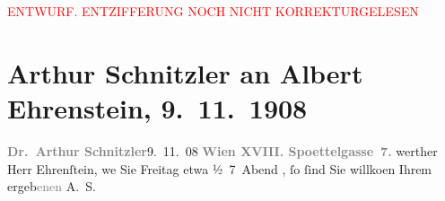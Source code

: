 
\begin{center}
            \textcolor{red}{ENTWURF. ENTZIFFERUNG NOCH NICHT KORREKTURGELESEN}
                      \end{center}
            
               \section[Arthur Schnitzler an Albert Ehrenstein, 9. 11. 1908]{ Arthur Schnitzler an Albert Ehrenstein, 9. 11. 1908}\nopagebreak{}\rehead{ }\begin{ledgroupsized}[t]{13cm}\normalsize\beginnumbering{} \toendnotes[C]{\smallbreak\pagebreak[2]} 
\toendnotes[C]{\smallbreak}\pstart
           \noindent{}{\pb}\textcolor{gray}{\textbf{Dr. Arthur Schnitzler}}\hfill 9. 11. 08\pend
           \pstart
           \textcolor{gray}{\textbf{Wien XVIII. Spoettelgasse 7.}}\pend
           \pstart{}werther Herr Ehrenſtein,\pend\pstart
           we{\geminationn}{ }Sie Freitag etwa
                        ½ 7 Abend{ }\label{K_L01798_1v}\label{K_L01798_1h}, ſo ſind Sie willko{\geminationm}en Ihrem\pend
           \pstart ergeb\textcolor{gray}{enen}{ }\spacefill\mbox{A. S.}\pend{}\endnumbering{}\end{ledgroupsized}  \newcommand{\dateiname}{L01798}\newcommand{\titel}{Arthur Schnitzler an Albert Ehrenstein, 9. 11. 1908}\newcommand{\editorInnen}{Martin Anton Müller und Gerd-Hermann Susen}
      